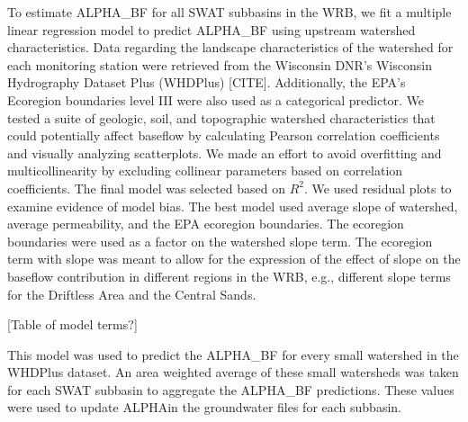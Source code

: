 	To estimate ALPHA\_BF for all SWAT subbasins in the WRB, we fit a multiple linear regression model to predict ALPHA\_BF using upstream watershed characteristics. Data regarding the landscape characteristics of the watershed for each monitoring station were retrieved from the Wisconsin DNR's Wisconsin Hydrography Dataset Plus (WHDPlus) [CITE]. Additionally, the EPA's Ecoregion boundaries level III were also used as a categorical predictor. We tested a suite of geologic, soil, and topographic watershed characteristics that could potentially affect baseflow by calculating Pearson correlation coefficients and visually analyzing scatterplots. We made an effort to avoid overfitting and multicollinearity by excluding collinear parameters based on correlation coefficients. The final model was selected based on $R^2$. We used residual plots to examine evidence of model bias. The best model used average slope of watershed, average permeability, and the EPA ecoregion boundaries. The ecoregion boundaries were used as a factor on the watershed slope term. The ecoregion term with slope was meant to allow for the expression of the effect of slope on the baseflow contribution in different regions in the WRB, e.g., different slope terms for the Driftless Area and the Central Sands.
	
	[Table of model terms?]
	
	This model was used to predict the ALPHA\_BF for every small watershed in the WHDPlus dataset. An area weighted average of these small watersheds was taken for each SWAT subbasin to aggregate the ALPHA\_BF predictions. These values were used to update ALPHA\BF in the groundwater files for each subbasin.